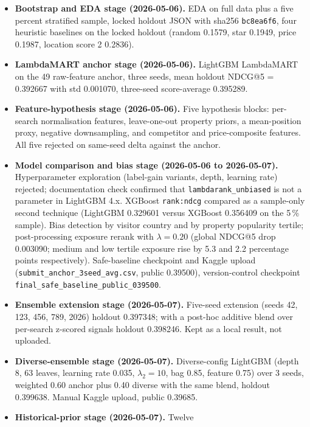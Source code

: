 \documentclass[a4paper,10pt]{article}
\begin{document}
\begin{itemize}[leftmargin=*]
\item \textbf{Bootstrap and EDA stage (2026-05-06).} EDA on full
    data plus a five percent stratified sample, locked holdout JSON
    with sha256 \texttt{bc8ea6f6}, four heuristic baselines on the
    locked holdout (random 0.1579, star 0.1949, price 0.1987,
    location score 2 0.2836).
\item \textbf{LambdaMART anchor stage (2026-05-06).} LightGBM
    LambdaMART on the 49 raw-feature anchor, three seeds, mean
    holdout NDCG@5 = 0.392667 with std 0.001070, three-seed
    score-average 0.395289.
\item \textbf{Feature-hypothesis stage (2026-05-06).} Five
    hypothesis blocks: per-search normalisation features,
    leave-one-out property priors, a mean-position proxy, negative
    downsampling, and competitor and price-composite features. All
    five rejected on same-seed delta against the anchor.
\item \textbf{Model comparison and bias stage
    (2026-05-06 to 2026-05-07).} Hyperparameter exploration
    (label-gain variants, depth, learning rate) rejected;
    documentation check confirmed that
    \texttt{lambdarank\_unbiased} is not a parameter in
    LightGBM 4.x. XGBoost \texttt{rank:ndcg} compared as a
    sample-only second technique (LightGBM 0.329601 versus
    XGBoost 0.356409 on the 5\,\% sample). Bias detection by
    visitor country and by property popularity tertile;
    post-processing exposure rerank with $\lambda = 0.20$
    (global NDCG@5 drop 0.003090; medium and low tertile exposure
    rise by 5.3 and 2.2 percentage points respectively).
    Safe-baseline checkpoint and Kaggle upload
    (\texttt{submit\_anchor\_3seed\_avg.csv}, public 0.39500),
    version-control checkpoint
    \texttt{final\_safe\_baseline\_public\_039500}.
\item \textbf{Ensemble extension stage (2026-05-07).} Five-seed
    extension (seeds 42, 123, 456, 789, 2026) holdout 0.397348;
    with a post-hoc additive blend over per-search z-scored
    signals holdout 0.398246. Kept as a local result, not
    uploaded.
\item \textbf{Diverse-ensemble stage (2026-05-07).} Diverse-config
    LightGBM (depth 8, 63 leaves, learning rate 0.035,
    $\lambda_2 = 10$, bag 0.85, feature 0.75) over 3 seeds,
    weighted 0.60 anchor plus 0.40 diverse with the same blend,
    holdout 0.399638. Manual Kaggle upload, public 0.39685.
\item \textbf{Historical-prior stage (2026-05-07).} Twelve

\end{itemize}
\end{document}
